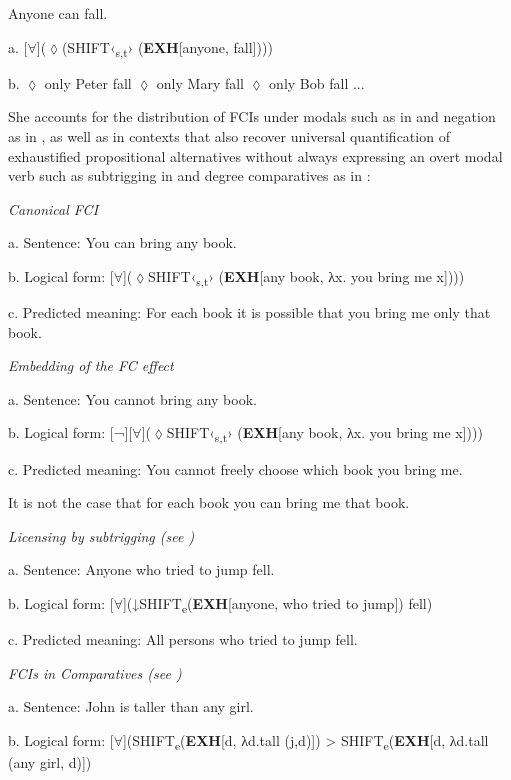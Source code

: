 \label{bkm:Ref150778689}  Anyone can fall. \citep{AloniEtAl2011}

  a.  [${\forall}$](${\lozenge}$(\textsc{SHIFT}‹\textsubscript{s,t}›\textsubscript{} (\textbf{EXH}[anyone, fall])))

  b.  ${\lozenge}$ only Peter fall  ${\lozenge}$ only Mary fall  ${\lozenge}$ only Bob fall  ...

    \citep{AloniEtAl2011}

She accounts for the distribution of FCIs under modals such as in  and negation as in , as well as in contexts that also recover universal quantification of exhaustified propositional alternatives without always expressing an overt modal verb such as subtrigging in  and degree comparatives as in :

\label{bkm:Ref63544535}  \textit{Canonical FCI}

  a.  Sentence: You can bring any book.

  b.  Logical form: [${\forall}$](${\lozenge}$\textsc{SHIFT}‹\textsubscript{s,t}› (\textbf{EXH}[any book, λx. you bring me x])))

  c.  Predicted meaning: For each book it is possible that you bring me only that book.

\label{bkm:Ref63544537}  \textit{Embedding of the FC effect}

  a.  Sentence: You cannot bring any book.

  b.  Logical form: [¬][${\forall}$](${\lozenge}$\textsc{SHIFT}‹\textsubscript{s,t}› (\textbf{EXH}[any book, λx. you bring me x])))

  c.  Predicted meaning: You cannot freely choose which book you bring me.

It is not the case that for each book you can bring me that book.

\label{bkm:Ref54857683}  \textit{Licensing by subtrigging (see \citealt{Aloni2007})}

  a.  Sentence: Anyone who tried to jump fell.

  b.  Logical form: [${\forall}$](↓\textsc{SHIFT}\textsubscript{e}(\textbf{EXH}[anyone, who tried to jump]) fell)

  c.  Predicted meaning: All persons who tried to jump fell.

\label{bkm:Ref54857674}  \textit{FCIs in Comparatives (see \citealt{Aloni2021})}

  a.  Sentence: John is taller than any girl.

  b.  Logical form: [${\forall}$](\textsc{SHIFT}\textsubscript{e}(\textbf{EXH}[d, λd.tall (j,d)]) > \textsc{SHIFT}\textsubscript{e}(\textbf{EXH}[d, λd.tall (any girl, d)])

